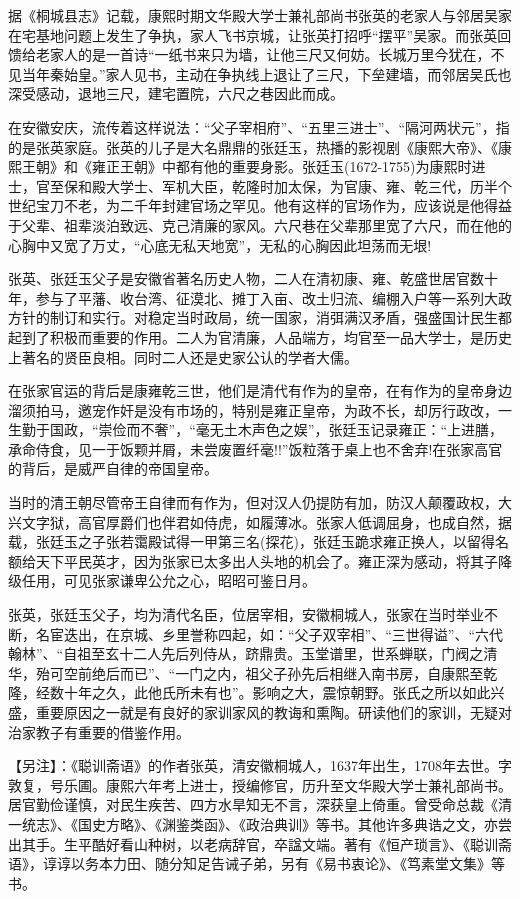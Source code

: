 \documentclass[letterpaper,10pt,english]{sphinxmanual}
\begin{document}
据《桐城县志》记载，康熙时期文华殿大学士兼礼部尚书张英的老家人与邻居吴家在宅基地问题上发生了争执，家人飞书京城，让张英打招呼“摆平”吴家。而张英回馈给老家人的是一首诗“一纸书来只为墙，让他三尺又何妨。长城万里今犹在，不见当年秦始皇。”家人见书，主动在争执线上退让了三尺，下垒建墙，而邻居吴氏也深受感动，退地三尺，建宅置院，六尺之巷因此而成。

在安徽安庆，流传着这样说法：“父子宰相府”、“五里三进士”、“隔河两状元”，指的是张英家庭。张英的儿子是大名鼎鼎的张廷玉，热播的影视剧《康熙大帝》、《康熙王朝》和《雍正王朝》中都有他的重要身影。张廷玉(1672-1755)为康熙时进士，官至保和殿大学士、军机大臣，乾隆时加太保，为官康、雍、乾三代，历半个世纪宝刀不老，为二千年封建官场之罕见。他有这样的官场作为，应该说是他得益于父辈、祖辈淡泊致远、克己清廉的家风。六尺巷在父辈那里宽了六尺，而在他的心胸中又宽了万丈，“心底无私天地宽”，无私的心胸因此坦荡而无垠!

张英、张廷玉父子是安徽省著名历史人物，二人在清初康、雍、乾盛世居官数十年，参与了平藩、收台湾、征漠北、摊丁入亩、改土归流、编棚入户等一系列大政方针的制订和实行。对稳定当时政局，统一国家，消弭满汉矛盾，强盛国计民生都起到了积极而重要的作用。二人为官清廉，人品端方，均官至一品大学士，是历史上著名的贤臣良相。同时二人还是史家公认的学者大儒。

在张家官运的背后是康雍乾三世，他们是清代有作为的皇帝，在有作为的皇帝身边溜须拍马，邀宠作奸是没有市场的，特别是雍正皇帝，为政不长，却厉行政改，一生勤于国政，“崇俭而不奢”，“毫无土木声色之娱”，张廷玉记录雍正：“上进膳，承命侍食，见一于饭颗并屑，未尝废置纤毫!!”饭粒落于桌上也不舍弃!在张家高官的背后，是威严自律的帝国皇帝。

当时的清王朝尽管帝王自律而有作为，但对汉人仍提防有加，防汉人颠覆政权，大兴文字狱，高官厚爵们也伴君如侍虎，如履薄冰。张家人低调屈身，也成自然，据载，张廷玉之子张若霭殿试得一甲第三名(探花)，张廷玉跪求雍正换人，以留得名额给天下平民英才，因为张家已太多出人头地的机会了。雍正深为感动，将其子降级任用，可见张家谦卑公允之心，昭昭可鉴日月。

张英，张廷玉父子，均为清代名臣，位居宰相，安徽桐城人，张家在当时举业不断，名宦迭出，在京城、乡里誉称四起，如：“父子双宰相”、“三世得谥”、“六代翰林”、“自祖至玄十二人先后列侍从，跻鼎贵。玉堂谱里，世系蝉联，门阀之清华，殆可空前绝后而已”、“一门之内，祖父子孙先后相继入南书房，自康熙至乾隆，经数十年之久，此他氏所未有也”。影响之大，震惊朝野。张氏之所以如此兴盛，重要原因之一就是有良好的家训家风的教诲和熏陶。研读他们的家训，无疑对治家教子有重要的借鉴作用。

【另注】：《聪训斋语》的作者张英，清安徽桐城人，1637年出生，1708年去世。字敦复，号乐圃。康熙六年考上进士，授编修官，历升至文华殿大学士兼礼部尚书。居官勤俭谨慎，对民生疾苦、四方水旱知无不言，深获皇上倚重。曾受命总裁《清一统志》、《国史方略》、《渊鉴类函》、《政治典训》等书。其他许多典诰之文，亦尝出其手。生平酷好看山种树，以老病辞官，卒諡文端。著有《恒产琐言》、《聪训斋语》，谆谆以务本力田、随分知足告诫子弟，另有《易书衷论》、《笃素堂文集》等书。
\end{document}
